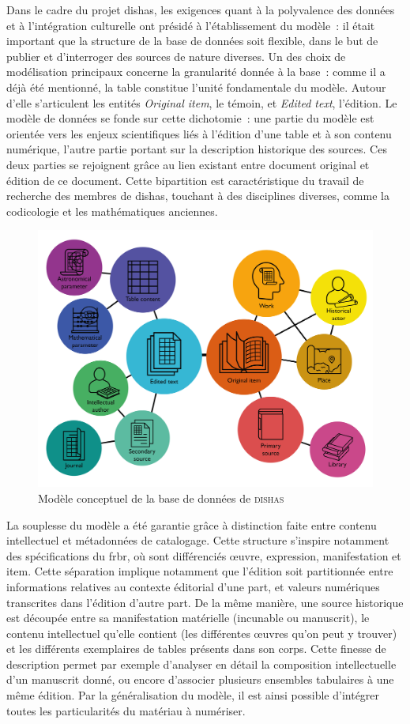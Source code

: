 \documentclass[a4paper,12pt,twoside]{book}
\newcommand{\eng}{\emph}
\newcommand{\Oi}{\eng{Original item}\xspace}
\newcommand{\dishas}{\gls{dishas}\xspace}
\newcommand{\frbr}{\gls{frbr}\xspace}
\begin{document}
Dans le cadre du projet \dishas, les exigences quant à la polyvalence des données et à l'intégration culturelle ont présidé à l'établissement du modèle~: il était important que la structure de la base de données soit flexible, dans le but de publier et d'interroger des sources de nature diverses. Un des choix de modélisation principaux concerne la granularité donnée à la base~: comme il a déjà été mentionné, la table constitue l'unité fondamentale du modèle. Autour d'elle s'articulent les entités \Oi, le témoin, et \eng{Edited text}, l'édition. Le modèle de données se fonde sur cette dichotomie~: une partie du modèle est orientée vers les enjeux scientifiques liés à l'édition d'une table et à son contenu numérique, l'autre partie portant sur la description historique des sources. Ces deux parties se rejoignent grâce au lien existant entre document original et édition de ce document. Cette bipartition est caractéristique du travail de recherche des membres de \dishas, touchant à des disciplines diverses, comme la codicologie et les mathématiques anciennes.

\begin{figure}[h!]
	\centering
	\includegraphics[width=12cm]{Images/Modele-de-donnees.png}
	\caption{\label{Modelisation}Modèle conceptuel de la base de données de \textsc{dishas}}
\end{figure}

La souplesse du modèle a été garantie grâce à distinction faite entre contenu intellectuel et métadonnées de catalogage. Cette structure s'inspire notamment des spécifications du \frbr, où sont différenciés œuvre, expression, manifestation et item. Cette séparation implique notamment que l'édition soit partitionnée entre informations relatives au contexte éditorial d'une part, et valeurs numériques transcrites dans l'édition d'autre part. De la même manière, une source historique est découpée entre sa manifestation matérielle (incunable ou manuscrit), le contenu intellectuel qu'elle contient (les différentes œuvres qu'on peut y trouver) et les différents exemplaires de tables présents dans son corps. Cette finesse de description permet par exemple d'analyser en détail la composition intellectuelle d'un manuscrit donné, ou encore d'associer plusieurs ensembles tabulaires à une même édition. Par la généralisation du modèle, il est ainsi possible d'intégrer toutes les particularités du matériau à numériser.
\end{document}
